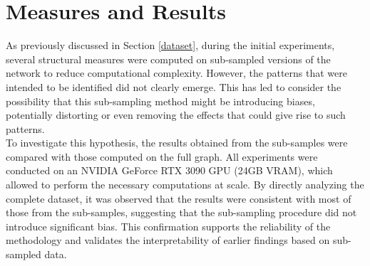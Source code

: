 \documentclass[12pt, a4paper]{article}
\begin{document}
\section{Measures and Results} \label{measures}
	As previously discussed in Section \ref{dataset}, during the initial experiments, several structural measures were computed on sub-sampled versions of the network to reduce computational complexity. However, the patterns that were intended to be identified did not clearly emerge. This has led to consider the possibility that this sub-sampling method might be introducing biases, potentially distorting or even removing the effects that could give rise to such patterns.\\
	To investigate this hypothesis, the results obtained from the sub-samples were compared with those computed on the full graph. All experiments were conducted on an NVIDIA GeForce RTX 3090 GPU (24GB VRAM), which allowed to perform the necessary computations at scale. By directly analyzing the complete dataset, it was observed that the results were consistent with most of those from the sub-samples, suggesting that the sub-sampling procedure did not introduce significant bias. This confirmation supports the reliability of the methodology and validates the interpretability of earlier findings based on sub-sampled data.
\end{document}
